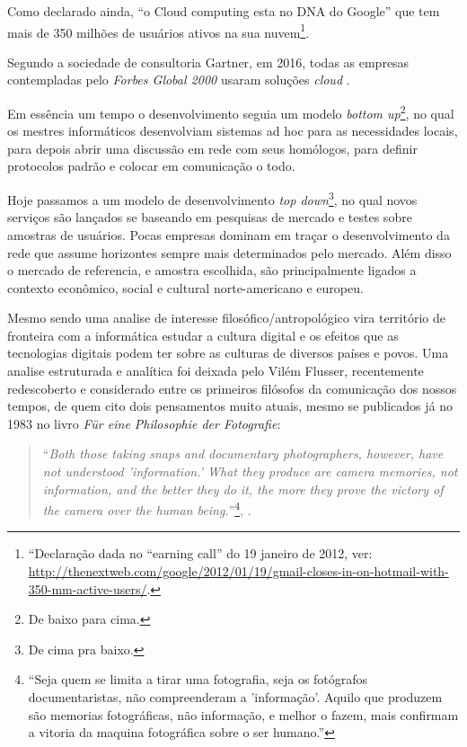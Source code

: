 Como declarado ainda, ``o Cloud computing esta no DNA do Google'' que
tem mais de 350 milhões de usuários ativos na sua
nuvem\footnote{``Declaração dada no ``earning call'' do 19 janeiro de
  2012, ver:
  \url{http://thenextweb.com/google/2012/01/19/gmail-closes-in-on-hotmail-with-350-mm-active-users/}.}.
 
Segundo a sociedade de consultoria Gartner, em 2016, todas as empresas
contempladas pelo \emph{Forbes Global 2000} usaram soluções
\emph{cloud} \citep{EY2011}.

Em essência um tempo o desenvolvimento seguia um modelo \emph{bottom
  up}\footnote{De baixo para cima.}, no qual os mestres informáticos
desenvolviam sistemas ad hoc para as necessidades locais, para depois
abrir uma discussão em rede com seus homólogos, para definir protocolos
padrão e colocar em comunicação o todo. 

Hoje passamos a um modelo de desenvolvimento \emph{top
  down}\footnote{De cima pra baixo.}, no qual novos serviços são
lançados se baseando em pesquisas de mercado e testes sobre amostras
de usuários. Pocas empresas dominam em traçar o desenvolvimento da
rede que assume horizontes sempre mais determinados pelo
mercado. Além disso o mercado de referencia, e amostra escolhida, são
principalmente ligados a contexto econômico, social e cultural
norte-americano e europeu.   

Mesmo sendo uma analise de interesse filosófico/antropológico vira
território de fronteira com a informática estudar a cultura digital e
os efeitos que as tecnologias digitais podem ter sobre as culturas de
diversos países e povos. Uma analise estruturada e analítica foi
deixada pelo Vilém Flusser, recentemente redescoberto e considerado
entre os primeiros filósofos da comunicação dos nossos tempos, de quem
cito dois pensamentos muito atuais, mesmo se publicados já no 1983 no
livro \emph{F{\"u}r eine Philosophie der Fotografie}:

\begin{quote}
  ``\emph{Both those taking snaps and documentary photographers, however,
  have not understood 'information.' What they produce are camera
  memories, not information, and the better they do it, the more they
  prove the victory of the camera over the human
  being.}''\footnote{``Seja quem se limita a tirar uma fotografia,
  seja os fotógrafos documentaristas, não compreenderam a
  'informação'. Aquilo que produzem são memorias fotográficas, não
  informação, e melhor o fazem, mais confirmam a vitoria da maquina
  fotográfica sobre o ser humano.''}, \citet{flusser1983philosophie}.
\end{quote}

